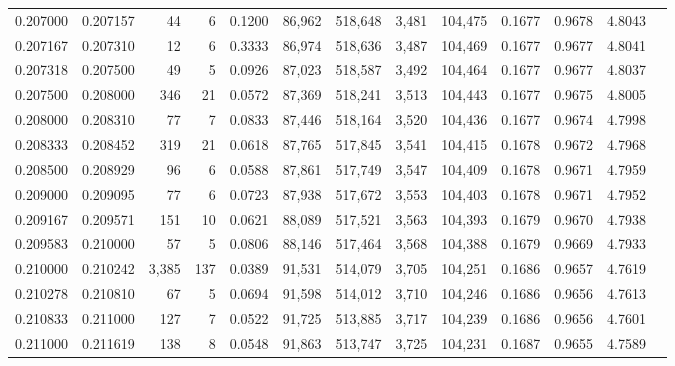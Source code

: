 \begin{tabular}{rrrrrrrrrrrrr}
0.207000 & 0.207157 &    44 &   6 &                                     0.1200 &  86,962 & 518,648 &   3,481 & 104,475 & 0.1677 & 0.9678 & 4.8043 \\
0.207167 & 0.207310 &    12 &   6 &                                     0.3333 &  86,974 & 518,636 &   3,487 & 104,469 & 0.1677 & 0.9677 & 4.8041 \\
0.207318 & 0.207500 &    49 &   5 &                                     0.0926 &  87,023 & 518,587 &   3,492 & 104,464 & 0.1677 & 0.9677 & 4.8037 \\
0.207500 & 0.208000 &   346 &  21 &                                     0.0572 &  87,369 & 518,241 &   3,513 & 104,443 & 0.1677 & 0.9675 & 4.8005 \\
0.208000 & 0.208310 &    77 &   7 &                                     0.0833 &  87,446 & 518,164 &   3,520 & 104,436 & 0.1677 & 0.9674 & 4.7998 \\
0.208333 & 0.208452 &   319 &  21 &                                     0.0618 &  87,765 & 517,845 &   3,541 & 104,415 & 0.1678 & 0.9672 & 4.7968 \\
0.208500 & 0.208929 &    96 &   6 &                                     0.0588 &  87,861 & 517,749 &   3,547 & 104,409 & 0.1678 & 0.9671 & 4.7959 \\
0.209000 & 0.209095 &    77 &   6 &                                     0.0723 &  87,938 & 517,672 &   3,553 & 104,403 & 0.1678 & 0.9671 & 4.7952 \\
0.209167 & 0.209571 &   151 &  10 &                                     0.0621 &  88,089 & 517,521 &   3,563 & 104,393 & 0.1679 & 0.9670 & 4.7938 \\
0.209583 & 0.210000 &    57 &   5 &                                     0.0806 &  88,146 & 517,464 &   3,568 & 104,388 & 0.1679 & 0.9669 & 4.7933 \\
0.210000 & 0.210242 & 3,385 & 137 &                                     0.0389 &  91,531 & 514,079 &   3,705 & 104,251 & 0.1686 & 0.9657 & 4.7619 \\
0.210278 & 0.210810 &    67 &   5 &                                     0.0694 &  91,598 & 514,012 &   3,710 & 104,246 & 0.1686 & 0.9656 & 4.7613 \\
0.210833 & 0.211000 &   127 &   7 &                                     0.0522 &  91,725 & 513,885 &   3,717 & 104,239 & 0.1686 & 0.9656 & 4.7601 \\
0.211000 & 0.211619 &   138 &   8 &                                     0.0548 &  91,863 & 513,747 &   3,725 & 104,231 & 0.1687 & 0.9655 & 4.7589 \\

\end{tabular}
